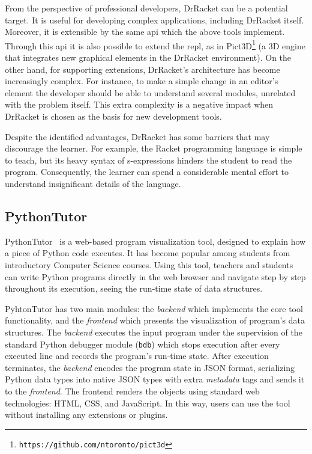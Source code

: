 From the perspective of professional developers, DrRacket can be a potential target. It is useful for developing complex applications, including DrRacket itself. Moreover, it is extensible by the same \gls{api} which the above tools implement. Through this \gls{api} it is also possible to extend the \gls{repl}, as in Pict3D\footnote{\texttt{https://github.com/ntoronto/pict3d}} (a 3D engine that integrates new graphical elements in the DrRacket environment). On the other hand, for supporting extensions, DrRacket's architecture has become increasingly complex. For instance, to make a simple change in an editor's element the developer should be able to understand several modules, unrelated with the problem itself. This extra complexity is a negative impact when DrRacket is chosen as the basis for new development tools.

Despite the identified advantages, DrRacket has some barriers that may discourage the learner. For example, the Racket programming language is simple to teach, but its heavy syntax of s-expressions hinders the student to read the program. Consequently, the learner can spend a considerable mental effort to understand insignificant details of the language.
\subsection{PythonTutor}
\label{subsec:pythontutor}
PythonTutor~\citep{GuoSIGCSE2013} is a web-based program visualization tool, designed to explain how a piece of Python code executes. It has become popular among students from introductory Computer Science courses. Using this tool, teachers and students can write Python programs directly in the web browser and navigate step by step throughout its execution, seeing the run-time state of data structures.

PyhtonTutor has two main modules: the \textit{backend} which implements the core tool functionality, and the \textit{frontend} which presents the visualization of program's data structures. The \textit{backend} executes the input program under the supervision of the standard Python debugger module (\texttt{bdb}) which stops execution after every executed line and records the program's run-time state. After execution terminates, the \textit{backend} encodes the program state in JSON format, serializing Python data types into native JSON types with extra \textit{metadata} tags and sends it to the \textit{frontend}. The frontend renders the objects using standard web technologies: HTML, CSS, and JavaScript. In this way, users can use the tool without installing any extensions or plugins.

